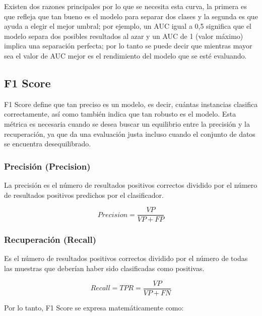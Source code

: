 \vspace{5mm} %

Existen dos razones principales por lo que se necesita esta curva, la primera es que refleja que tan bueno es el modelo para separar dos clases y la segunda es que ayuda a elegir el mejor umbral; por ejemplo, un AUC igual a 0,5 significa que el modelo separa dos posibles resultados al azar y un AUC de 1 (valor m\'{a}ximo) implica una separaci\'{o}n perfecta; por lo tanto se puede decir que mientras mayor sea el valor de AUC mejor es el rendimiento del modelo que se est\'{e} evaluando.

\subsection{F1 Score}

F1 Score define que tan preciso es un modelo, es decir, cu\'{a}ntas instancias clasifica correctamente, as\'{i} como tambi\'{e}n indica que tan robusto es el modelo. Esta m\'{e}trica es necesaria cuando se desea buscar un equilibrio entre la precisi\'{o}n y la recuperaci\'{o}n, ya que da una evaluaci\'{o}n justa incluso cuando el conjunto de datos se encuentra desequilibrado.

\subsubsection{Precisi\'{o}n (Precision)}

La precisi\'{o}n es el n\'{u}mero de resultados positivos correctos dividido por el n\'{u}mero de resultados positivos predichos por el clasificador.

\begin{equation}
Precision = \frac{VP}{VP+FP}
\end{equation}

\subsubsection{Recuperaci\'{o}n (Recall)}

Es el n\'{u}mero de resultados positivos correctos dividido por el n\'{u}mero de todas las muestras que deber\'{i}an haber sido clasificadas como positivas.

\begin{equation}
Recall = TPR = \frac{VP}{VP+FN}
\end{equation}

Por lo tanto, F1 Score se expresa matem\'{a}ticamente como:

